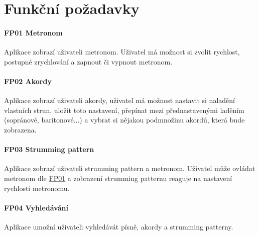 \section{Funkční požadavky}
\label{sc:functional_req}

\noindent \begin{minipage}{\textwidth}
    \paragraph{FP01 Metronom} \label{FP01}
    \begin{smallindent}{}
        Aplikace zobrazí uživateli metronom. Uživatel má možnost si zvolit rychlost, postupné zrychlování a zapnout či vypnout metronom.
    \end{smallindent}
\end{minipage}

\noindent \begin{minipage}{\textwidth}
    \paragraph{FP02 Akordy} \label{FP02}
    \begin{smallindent}{}
        Aplikace zobrazí uživateli akordy, uživatel má možnost nastavit si naladění vlastních strun, uložit toto nastavení, přepínat mezi přednastavenými laděním (sopránové, baritonové...) a vybrat si nějakou podmnožinu akordů, která bude zobrazena.
    \end{smallindent}
\end{minipage}

\noindent \begin{minipage}{\textwidth}
    \paragraph{FP03 Strumming pattern} \label{FP03}
    \begin{smallindent}{}
        Aplikace zobrazí uživateli strumming pattern a metronom. Uživatel může ovládat metronom dle \hyperref[FP01]{FP01} a zobrazení strumming patternu reaguje na nastavení rychlosti metronomu.
    \end{smallindent}
\end{minipage}

\noindent \begin{minipage}{\textwidth}
    \paragraph{FP04 Vyhledávání} \label{FP04}
    \begin{smallindent}{}
        Aplikace umožní uživateli vyhledávát písně, akordy a strumming patterny.
    \end{smallindent}
\end{minipage}

